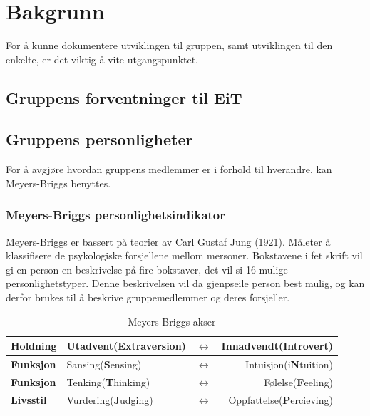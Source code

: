 \chapter{Bakgrunn}
For å kunne dokumentere utviklingen til gruppen, samt utviklingen til den enkelte, er det viktig å vite utgangspunktet.

\section{Gruppens forventninger til EiT}

\section{Gruppens personligheter}
For å avgjøre hvordan gruppens medlemmer er i forhold til hverandre, kan Meyers-Briggs benyttes.

\subsection{Meyers-Briggs personlighetsindikator}
Meyers-Briggs er bassert på teorier av Carl Gustaf Jung (1921).
Måleter å klassifisere de psykologiske forsjellene mellom mersoner.
Bokstavene i fet skrift vil gi en person en beskrivelse på fire bokstaver, det vil si 16 mulige personlighetstyper.
Denne beskrivelsen vil da gjenpseile person best mulig, og kan derfor brukes til å beskrive gruppemedlemmer og deres forsjeller.
\vspace{\secspace}

\begin{table}[H]
    \centering
    \begin{tabular}{| l | l c r |}
        \hline
        \textbf{Holdning} & Utadvent(\textbf{E}xtraversion) & $\leftrightarrow$ & Innadvendt(\textbf{I}ntrovert) \\ \hline
        \textbf{Funksjon} & Sansing(\textbf{S}ensing) & $\leftrightarrow$ & Intuisjon(i\textbf{N}tuition) \\ \hline
        \textbf{Funksjon} & Tenking(\textbf{T}hinking) & $\leftrightarrow$ & Følelse(\textbf{F}eeling) \\ \hline
        \textbf{Livsstil} & Vurdering(\textbf{J}udging) & $\leftrightarrow$ & Oppfattelse(\textbf{P}ercieving) \\
        \hline
    \end{tabular}
    \label{tab:meyersbriggs}
    \caption{Meyers-Briggs akser}
\end{table}

